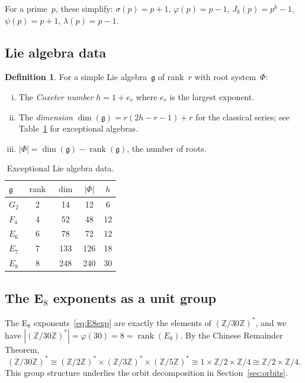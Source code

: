 \documentclass[11pt]{amsart}
\theoremstyle{plain}
\theoremstyle{definition}
\newtheorem{definition}[theorem]{Definition}
\theoremstyle{remark}
\newcommand{\fg}{\mathfrak{g}}
\renewcommand{\Phi}{\varPhi}
\newcommand{\rank}{\operatorname{rank}}
\begin{document}
For a prime~$p$, these simplify: $\sigma(p)=p+1$, $\varphi(p)=p-1$,
$J_k(p)=p^k-1$, $\psi(p)=p+1$, $\lambda(p)=p-1$.

\subsection{Lie algebra data}

\begin{definition}\label{def:lie-data}
For a simple Lie algebra~$\fg$ of rank~$r$ with root system~$\Phi$:
\begin{enumerate}[(i)]
  \item The \emph{Coxeter number} $h = 1 + e_r$ where $e_r$ is the largest exponent.
  \item The \emph{dimension} $\dim(\fg) = r(2h - r - 1) + r$ for the classical series;
    see Table~\ref{tab:lie-dims} for exceptional algebras.
  \item $|\Phi| = \dim(\fg) - \rank(\fg)$, the number of roots.
\end{enumerate}
\end{definition}

\begin{table}[ht]
\centering
\caption{Exceptional Lie algebra data.}\label{tab:lie-dims}
\begin{tabular}{@{}lcccc@{}}
\toprule
$\fg$ & $\rank$ & $\dim$ & $|\Phi|$ & $h$ \\
\midrule
$G_2$  & 2  & 14  & 12  & 6  \\
$F_4$  & 4  & 52  & 48  & 12 \\
$E_6$  & 6  & 78  & 72  & 12 \\
$E_7$  & 7  & 133 & 126 & 18 \\
$E_8$  & 8  & 248 & 240 & 30 \\
\bottomrule
\end{tabular}
\end{table}

\subsection{The E$_8$ exponents as a unit group}

The E$_8$ exponents~\eqref{eq:E8exp} are exactly the elements of
$(\mathbb{Z}/30\mathbb{Z})^*$, and we have $|(\mathbb{Z}/30\mathbb{Z})^*|
= \varphi(30) = 8 = \rank(E_8)$.  By the Chinese Remainder Theorem,
\begin{equation}\label{eq:CRT}
  (\mathbb{Z}/30\mathbb{Z})^* \cong
  (\mathbb{Z}/2\mathbb{Z})^* \times (\mathbb{Z}/3\mathbb{Z})^* \times (\mathbb{Z}/5\mathbb{Z})^*
  \cong 1 \times \mathbb{Z}/2 \times \mathbb{Z}/4
  \cong \mathbb{Z}/2 \times \mathbb{Z}/4.
\end{equation}
This group structure underlies the orbit decomposition in
Section~\ref{sec:orbits}.
\end{document}
